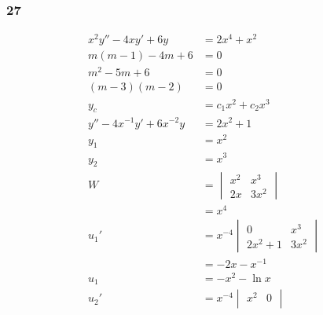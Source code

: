 \documentclass{article}
\begin{document}
\subsubsection{27}

\begin{align*}
  x^2 y'' - 4 x y' + 6 y         & = 2 x^4 + x^2                            \\
  m (m - 1) - 4 m + 6            & = 0                                      \\
  m^2 - 5 m + 6                  & = 0                                      \\
  (m - 3) (m - 2)                & = 0                                      \\
  y_c                            & = c_1 x^2 + c_2 x^3                      \\
  y'' - 4 x^{-1} y' + 6 x^{-2} y & = 2 x^2 + 1                              \\
  y_1                            & = x^2                                    \\
  y_2                            & = x^3                                    \\
  W                              & = \begin{vmatrix}
                                       x^2 & x^3   \\
                                       2 x & 3 x^2
                                     \end{vmatrix}                         \\
                                 & = x^4                                    \\
  u_1'                           & = x^{-4} \begin{vmatrix}
                                              0         & x^3   \\
                                              2 x^2 + 1 & 3 x^2
                                            \end{vmatrix}               \\
                                 & = -2 x - x^{-1}                          \\
  u_1                            & = -x^2 - \ln x                           \\
  u_2'                           & = x^{-4} \begin{vmatrix}
                                              x^2 & 0         \\

\end{vmatrix}
\end{align*}
\end{document}
